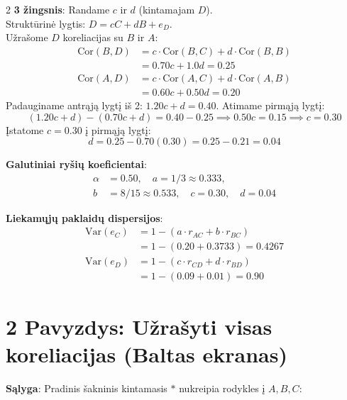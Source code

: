 \documentclass[9pt,a4paper]{article}
\begin{document}
\begin{multicols*}{2}
\textbf{3 žingsnis}: Randame $c$ ir $d$ (kintamajam $D$).\\
Struktūrinė lygtis: $D = c C + d B + e_D$.\\
Užrašome $D$ koreliacijas su $B$ ir $A$:
\begin{align*}
    \text{Cor}(B, D) &= c \cdot \text{Cor}(B, C) + d \cdot \text{Cor}(B, B) \\
    &= 0.70 c + 1.0 d = 0.25 \\
    \text{Cor}(A, D) &= c \cdot \text{Cor}(A, C) + d \cdot \text{Cor}(A, B) \\
    &= 0.60 c + 0.50 d = 0.20
\end{align*}
Padauginame antrąją lygtį iš 2: $1.20 c + d = 0.40$. Atimame pirmąją lygtį:
\begin{equation*}
    (1.20 c + d) - (0.70 c + d) = 0.40 - 0.25 \implies 0.50 c = 0.15 \implies c = 0.30
\end{equation*}
Įstatome $c = 0.30$ į pirmąją lygtį:
\begin{equation*}
    d = 0.25 - 0.70(0.30) = 0.25 - 0.21 = 0.04
\end{equation*}

\textbf{Galutiniai ryšių koeficientai}:
\begin{align*}
    \alpha &= 0.50, \quad a = 1/3 \approx 0.333, \\
    b &= 8/15 \approx 0.533, \quad c = 0.30, \quad d = 0.04
\end{align*}

\textbf{Liekamųjų paklaidų dispersijos}:
\begin{align*}
    \text{Var}(e_C) &= 1 - (a \cdot r_{AC} + b \cdot r_{BC}) \\
    &= 1 - (0.20 + 0.3733) = 0.4267 \\
    \text{Var}(e_D) &= 1 - (c \cdot r_{CD} + d \cdot r_{BD}) \\
    &= 1 - (0.09 + 0.01) = 0.90
\end{align*}

\section{2 Pavyzdys: Užrašyti visas koreliacijas (Baltas ekranas)}
\textbf{Sąlyga}:
Pradinis šakninis kintamasis $*$ nukreipia rodykles į $A, B, C$:

\begin{center}
\end{center}
\end{multicols*}
\end{document}
